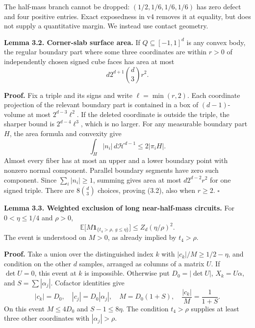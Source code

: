 \documentclass[
  11pt,
]{article}
\begin{document}
The half-mass branch cannot be dropped: \((1/2,1/6,1/6,1/6)\) has zero
defect and four positive entries. Exact exposedness in v4 removes it at
equality, but does not supply a quantitative margin. We instead use
contact geometry.

\textbf{Lemma 3.2. Corner-slab surface area.} If \(Q\subseteq[-1,1]^d\)
is any convex body, the regular boundary part where some three
coordinates are within \(r>0\) of independently chosen signed cube faces
has area at most \[
 d2^{d+1}\binom d3r^2.                                         \tag{3.2}
\]

\textbf{Proof.} Fix a triple and its signs and write \(\ell=\min(r,2)\).
Each coordinate projection of the relevant boundary part is contained in
a box of \((d-1)\)-volume at most \(2^{d-3}\ell^2\). If the deleted
coordinate is outside the triple, the sharper bound is
\(2^{d-4}\ell^3\), which is no larger. For any measurable boundary part
\(H\), the area formula and convexity give \[
 \int_H |n_i|\,d\mathcal H^{d-1}\le2|\pi_iH|.
\] Almost every fiber has at most an upper and a lower boundary point
with nonzero normal component. Parallel boundary segments have zero such
component. Since \(\sum_i|n_i|\ge1\), summing gives area at most
\(d2^{d-2}r^2\) for one signed triple. There are \(8\binom d3\) choices,
proving (3.2), also when \(r\ge2\). \(\square\)

\textbf{Lemma 3.3. Weighted exclusion of long near-half-mass circuits.}
For \(0<\eta\le1/4\) and \(\rho>0\), \[
 \mathbb E\bigl[M\mathbf1_{\{t_4>\rho,\ g\le\eta\}}\bigr]
 \le Z_d(\eta/\rho)^2.                                        \tag{3.3}
\] The event is understood on \(M>0\), as already implied by
\(t_4>\rho\).

\textbf{Proof.} Take a union over the distinguished index \(k\) with
\(|c_k|/M\ge1/2-\eta\), and condition on the other \(d\) samples,
arranged as columns of a matrix \(U\). If \(\det U=0\), this event at
\(k\) is impossible. Otherwise put \(D_0=|\det U|\), \(X_k=U\alpha\),
and \(S=\sum|\alpha_j|\). Cofactor identities give \[
 |c_k|=D_0,\quad |c_j|=D_0|\alpha_j|,
 \quad M=D_0(1+S),\quad \frac{|c_k|}M=\frac1{1+S}.
\] On this event \(M\le4D_0\) and \(S-1\le8\eta\). The condition
\(t_4>\rho\) supplies at least three other coordinates with
\(|\alpha_j|>\rho\).
\end{document}
